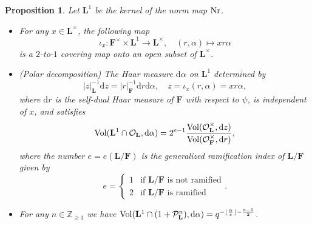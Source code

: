 \documentclass[A4]{amsart}
\def\geq{\geqslant}
\newtheorem{proposition}[theorem]{Proposition}
\numberwithin{equation}{section} \everymath{\displaystyle}
\newcommand{\Nr}{{\rm Nr}}
\newcommand{\Z}{\mathbb{Z}}
\newcommand{\ud}{\mathrm{d}}
\newcommand{\F}{\mathbf{F}}
\newcommand{\bL}{\mathbf{L}}
\newcommand{\vO}{\mathcal{O}}
\newcommand{\vP}{\mathcal{P}}
\newcommand{\norm}[1][\cdot]{\lvert #1 \rvert}
\newcommand{\Vol}{{\rm Vol}}
\begin{document}
\begin{proposition} \label{prop: MeasNorm}
	Let $\bL^1$ be the kernel of the norm map $\Nr$.
\begin{itemize}
	\item[(1)] For any $x \in \bL^{\times}$, the following map
	$$ \iota_x: \F^{\times} \times \bL^1 \to \bL^{\times}, \quad (r,\alpha) \mapsto xr\alpha $$
	is a $2$-to-$1$ covering map onto an open subset of $\bL^{\times}$. 
	\item[(2)] (Polar decomposition) The Haar measure $\ud \alpha$ on $\bL^1$ determined by
\begin{equation} \label{eq: MeasComp}
	\norm[z]_{\bL}^{-1} \ud z = \norm[r]_{\F}^{-1} \ud r \ud \alpha, \quad z = \iota_x(r,\alpha) = x r \alpha,
\end{equation}
	where $\ud r$ is the self-dual Haar measure of $\F$ with respect to $\psi$, is independent of $x$, and satisfies
	$$ \Vol(\bL^1 \cap \vO_{\bL}, \ud \alpha) = 2^{e-1} \frac{\Vol(\vO_{\bL}^{\times}, \ud z)}{\Vol(\vO_{\F}^{\times}, \ud r)}, $$
where the number $e = e(\bL/\F)$ is the \emph{generalized ramification index} of $\bL/\F$ given by
\begin{equation} \label{eq: GenRamInd}
	e = \begin{cases} 1 & \text{if } \bL/\F \text{ is not ramified} \\ 2 & \text{if } \bL/\F \text{ is ramified} \end{cases}. 
\end{equation}
	\item[(3)] For any $n \in \Z_{\geq 1}$ we have $\Vol(\bL^1 \cap (1+\vP_{\bL}^n), \ud \alpha) = q^{-\lfloor \frac{n}{e} \rfloor - \frac{e-1}{2}}$.
\end{itemize}
\end{proposition}
\end{document}
